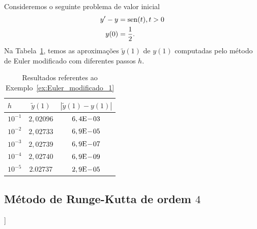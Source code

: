 \begin{ex}\label{ex:Euler_modificado_1}
  Consideremos o seguinte problema de valor inicial
  \begin{align}
    y' - y &= \operatorname{sen}(t), t>0\\
    y(0) &= \frac{1}{2}.
  \end{align}
  Na Tabela~\ref{tab:ex_Euler_modificado_1}, temos as aproximações $\tilde{y}(1)$ de $y(1)$ computadas pelo método de Euler modificado com diferentes passos $h$.
 
  \begin{table}[h!]
    \centering
    \begin{tabular}{l|cc}
      $h$ & $\tilde{y}(1)$ & $|\tilde{y}(1)-y(1)|$\\\hline
      $10^{-1}$ & $2,02096$ & $6,4\mathrm{E}\!-\!03$ \\
      $10^{-2}$ & $2,02733$ & $6,9\mathrm{E}\!-\!05$ \\
      $10^{-3}$ & $2,02739$ & $6,9\mathrm{E}\!-\!07$ \\
      $10^{-4}$ & $2,02740$ & $6,9\mathrm{E}\!-\!09$ \\
      $10^{-5}$ & $2.02737$ & $2,9\mathrm{E}\!-\!05$ \\\hline
    \end{tabular}
    \caption{Resultados referentes ao Exemplo~\ref{ex:Euler_modificado_1}}
    \label{tab:ex_Euler_modificado_1}
  \end{table}





\end{ex}

\subsection{Método de Runge-Kutta de ordem $4$}

\begin{flushleft}
  [[tag:revisar]]
\end{flushleft}

